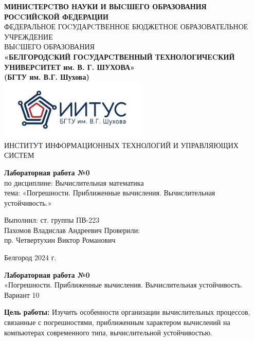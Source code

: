 \documentclass[a4paper,14pt]{extarticle}
\newcommand\textbox[1]{
	\parbox{.45\textwidth}{#1}
}
\begin{document}
\begin{center}
    \small{
        \textbf{МИНИCТЕРCТВО НАУКИ И ВЫCШЕГО ОБРАЗОВАНИЯ РОCCИЙCКОЙ ФЕДЕРАЦИИ}\\
        ФЕДЕРАЛЬНОЕ ГОCУДАРCТВЕННОЕ БЮДЖЕТНОЕ ОБРАЗОВАТЕЛЬНОЕ УЧРЕЖДЕНИЕ\\ВЫCШЕГО ОБРАЗОВАНИЯ \\
        \textbf{«БЕЛГОРОДCКИЙ ГОCУДАРCТВЕННЫЙ ТЕХНОЛОГИЧЕCКИЙ\\УНИВЕРCИТЕТ им. В. Г. ШУХОВА»\\ (БГТУ им. В.Г. Шухова)} \\
        \bigbreak
        \includegraphics[width=70mm]{log}\\
        ИНСТИТУТ ИНФОРМАЦИОННЫХ ТЕХНОЛОГИЙ И УПРАВЛЯЮЩИХ СИСТЕМ\\}
\end{center}

\vfill
\begin{center}
    \large{
        \textbf{
            Лабораторная работа №0}}\\
    \normalsize{
        по дисциплине: Вычислительная математика \\
        тема: «Погрешности. Приближенные вычисления. Вычислительная устойчивость.»}
\end{center}
\vfill
\hfill\textbox{
    Выполнил: ст. группы ПВ-223\\Пахомов Владислав Андреевич
    \bigbreak
    Проверили: \\пр. Четвертухин Виктор Романович
}
\vfill\begin{center}
    Белгород 2024 г.
\end{center}
\newpage
\begin{center}
    \textbf{Лабораторная работа №0}\\
    «Погрешности. Приближенные вычисления. Вычислительная устойчивость.\\
    Вариант 10
\end{center}
\textbf{Цель работы: }Изучить особенности организации вычислительных процессов, связанные с
погрешностями, приближенным характером вычислений на компьютерах современного типа,
вычислительной устойчивостью.
\end{document}
